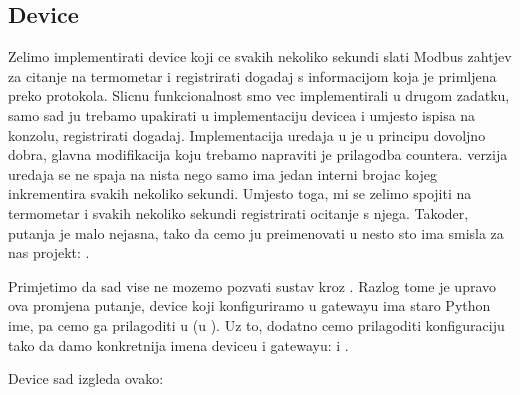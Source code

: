 \documentclass[letterpaper,10pt,croatian]{sphinxmanual}
\begin{document}
\subsection{Device}
\label{\detokenize{03-hat-modbus-workshop/index:device}}
\noindent{}

\sphinxAtStartPar
Zelimo implementirati device koji ce svakih nekoliko sekundi slati Modbus
zahtjev za citanje na termometar i registrirati dogadaj s informacijom koja je
primljena preko protokola. Slicnu funkcionalnost smo vec implementirali u
drugom zadatku, samo sad ju trebamo upakirati u implementaciju devicea i
umjesto ispisa na konzolu, registrirati dogadaj. Implementacija uredaja u
 je u principu dovoljno dobra, glavna
modifikacija koju trebamo napraviti je prilagodba countera.  verzija
uredaja se ne spaja na nista nego samo ima jedan interni brojac kojeg
inkrementira svakih nekoliko sekundi. Umjesto toga, mi se zelimo spojiti na
termometar i svakih nekoliko sekundi registrirati ocitanje s njega. Takoder,
putanja  je malo nejasna, tako da cemo ju
preimenovati u nesto sto ima smisla za nas projekt:
.

\sphinxAtStartPar
Primjetimo da sad vise ne mozemo pozvati sustav kroz . Razlog
tome je upravo ova promjena putanje, device koji konfiguriramo u gatewayu ima
staro Python ime, pa cemo ga prilagoditi u 
(u ). Uz to, dodatno cemo prilagoditi
konfiguraciju tako da damo konkretnija imena deviceu i gatewayu:  i
.

\sphinxAtStartPar
Device sad izgleda ovako:
\end{document}
